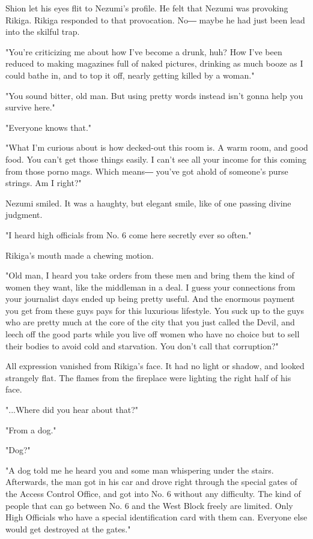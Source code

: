 Shion let his eyes flit to Nezumi's profile. He felt that Nezumi was
provoking Rikiga. Rikiga responded to that provocation. No― maybe he had
just been lead into the skilful trap.

"You're criticizing me about how I've become a drunk, huh? How I've been
reduced to making magazines full of naked pictures, drinking as much
booze as I could bathe in, and to top it off, nearly getting killed by a
woman."

"You sound bitter, old man. But using pretty words instead isn't gonna
help you survive here."

"Everyone knows that."

"What I'm curious about is how decked-out this room is. A warm room, and
good food. You can't get those things easily. I can't see all your
income for this coming from those porno mags. Which means― you've got
ahold of someone's purse strings. Am I right?"

Nezumi smiled. It was a haughty, but elegant smile, like of one passing
divine judgment.

"I heard high officials from No. 6 come here secretly ever so often."

Rikiga's mouth made a chewing motion.

"Old man, I heard you take orders from these men and bring them the kind
of women they want, like the middleman in a deal. I guess your
connections from your journalist days ended up being pretty useful. And
the enormous payment you get from these guys pays for this luxurious
lifestyle. You suck up to the guys who are pretty much at the core of
the city that you just called the Devil, and leech off the good parts
while you live off women who have no choice but to sell their bodies to
avoid cold and starvation. You don't call that corruption?"

All expression vanished from Rikiga's face. It had no light or shadow,
and looked strangely flat. The flames from the fireplace were lighting
the right half of his face.

"...Where did you hear about that?"

"From a dog."

"Dog?"

"A dog told me he heard you and some man whispering under the stairs.
Afterwards, the man got in his car and drove right through the special
gates of the Access Control Office, and got into No. 6 without any
difficulty. The kind of people that can go between No. 6 and the West
Block freely are limited. Only High Officials who have a special
identification card with them can. Everyone else would get destroyed at
the gates."

